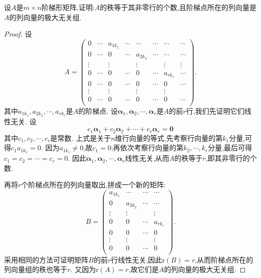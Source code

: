 \documentclass[../../main.tex]{subfiles}
\begin{document}
\begin{proposition}\label{proposition:阶梯形矩阵的非零行对应其列向量的极大无关组}
设\(A\)是\(m\times n\)阶梯形矩阵,证明:\(A\)的秩等于其非零行的个数,且阶梯点所在的列向量是\(A\)的列向量的极大无关组.
\end{proposition}
\begin{proof}
设
\[
A=\left( \begin{matrix}
0&		\cdots&		a_{1k_1}&		\cdots&		\cdots&		\cdots&		\cdots&		\cdots\\
0&		\cdots&		0&		\cdots&		a_{2k_2}&		\cdots&		\cdots&		\cdots\\
\vdots&		&		\vdots&		&		\vdots&		&		\vdots&		\vdots\\
0&		\cdots&		0&		\cdots&		0&		\cdots&		a_{rk_r}&		\cdots\\
0&		\cdots&		0&		\cdots&		0&		\cdots&		0&		\cdots\\
\vdots&		&		\vdots&		&		\vdots&		&		\vdots&		\\
0&		\cdots&		0&		\cdots&		0&		\cdots&		0&		\cdots\\
\end{matrix} \right) .
\]
其中\(a_{1k_1},a_{2k_2},\cdots,a_{rk_r}\)是\(A\)的阶梯点. 设\(\boldsymbol{\alpha}_1,\boldsymbol{\alpha}_2,\cdots,\boldsymbol{\alpha}_r\)是\(A\)的前\(r\)行,我们先证明它们线性无关. 设
\[
c_1\boldsymbol{\alpha}_1 + c_2\boldsymbol{\alpha}_2+\cdots + c_r\boldsymbol{\alpha}_r=\boldsymbol{0}
\]
其中\(c_1,c_2,\cdots,c_r\)是常数. 上式是关于\(n\)维行向量的等式,先考察行向量的第\(k_1\)分量,可得\(c_1a_{1k_1}=0\). 因为\(a_{1k_1}\neq0\),故\(c_1 = 0\);再依次考察行向量的第\(k_2,\cdots,k_r\)分量,最后可得\(c_1 = c_2=\cdots = c_r = 0\). 因此\(\boldsymbol{\alpha}_1,\boldsymbol{\alpha}_2,\cdots,\boldsymbol{\alpha}_r\)线性无关,从而\(A\)的秩等于\(r\),即其非零行的个数.

再将\(r\)个阶梯点所在的列向量取出,拼成一个新的矩阵:
\[
B=\left( \begin{matrix}
a_{1k_1}&		\cdots&		\cdots&		\cdots\\
0&		a_{2k_2}&		\cdots&		\cdots\\
\vdots&		\vdots&		&		\vdots\\
0&		0&		\cdots&		a_{rk_r}\\
0&		0&		\cdots&		0\\
\vdots&		\vdots&		&		\vdots\\
0&		0&		\cdots&		0\\
\end{matrix} \right) .
\]
采用相同的方法可证明矩阵\(B\)的前\(r\)行线性无关,因此\(\text{r}(B)=r\),从而阶梯点所在的列向量组的秩也等于\(r\). 又因为\(\text{r}(A)=r\),故它们是\(A\)的列向量的极大无关组.
\end{proof}
\end{document}
